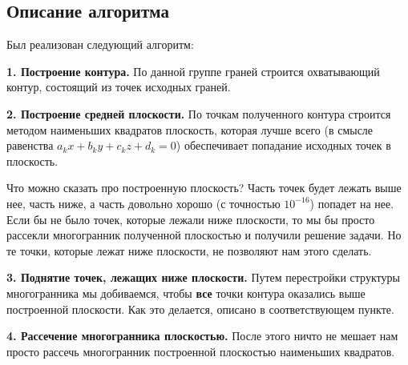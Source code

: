 \documentclass[a4paper,12pt, titlepage]{article}
\begin{document}
\subsection{Описание алгоритма}
\begin{flushleft}
 Был реализован следующий алгоритм:
\end{flushleft}
\begin{flushleft}
 \textbf{1. Построение контура.} По данной группе граней строится охватывающий контур, состоящий из точек 
исходных граней.
\end{flushleft}
\begin{flushleft}
 \textbf{2. Построение средней плоскости.} По точкам полученного контура строится методом наименьших
квадратов плоскость, которая лучше всего (в смысле равенства $a_{k} x + b_{k} y + c_{k} z + d_{k} = 0$)
обеспечивает попадание исходных точек в плоскость.
\end{flushleft}
\begin{flushleft}
 Что можно сказать про построенную плоскость? Часть точек будет лежать выше нее, часть ниже, а часть довольно
хорошо (с точностью $10^{-16}$) попадет на нее. Если бы не было точек, которые лежали ниже плоскости, то 
мы бы просто рассекли многогранник полученной плоскостью и получили решение задачи. Но те точки, которые лежат 
ниже плоскости, не позволяют нам этого сделать.
\end{flushleft}
\begin{flushleft}
 \textbf{3. Поднятие точек, лежащих ниже плоскости.} Путем перестройки структуры многогранника мы добиваемся, 
чтобы \textbf{все} точки контура оказались выше построенной плоскости. Как это делается, описано в 
соответствующем пункте.
\end{flushleft}
\begin{flushleft}
 \textbf{4. Рассечение многогранника плоскостью.} После этого ничто не мешает нам просто рассечь многогранник
построенной плоскостью наименьших квадратов.
\end{flushleft}
\end{document}
